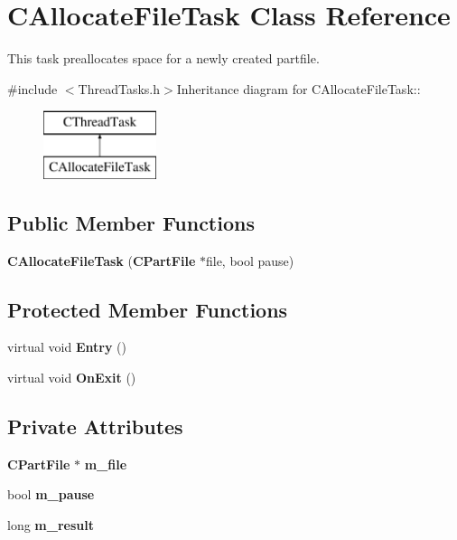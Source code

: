 \section{CAllocateFileTask Class Reference}
\label{classCAllocateFileTask}


This task preallocates space for a newly created partfile.  


{\ttfamily \#include $<$ThreadTasks.h$>$}Inheritance diagram for CAllocateFileTask::\begin{figure}[H]
\begin{center}
\leavevmode
\includegraphics[height=2cm]{classCAllocateFileTask}
\end{center}
\end{figure}
\subsection*{Public Member Functions}
\begin{DoxyCompactItemize}
\item 
{\bf CAllocateFileTask} ({\bf CPartFile} $\ast$file, bool pause)
\end{DoxyCompactItemize}
\subsection*{Protected Member Functions}
\begin{DoxyCompactItemize}
\item 
virtual void {\bf Entry} ()\label{classCAllocateFileTask_a03b090460a948ecdd522fa50ceaf6cf8}

\item 
virtual void {\bf OnExit} ()\label{classCAllocateFileTask_abf55789dd62e67cf82f93794e984348a}

\end{DoxyCompactItemize}
\subsection*{Private Attributes}
\begin{DoxyCompactItemize}
\item 
{\bf CPartFile} $\ast$ {\bf m\_\-file}\label{classCAllocateFileTask_a8bbefd9a2007c46d7c96daf82637b913}

\item 
bool {\bf m\_\-pause}\label{classCAllocateFileTask_a0828fd81e5e0a17171dc04d31fb89196}

\item 
long {\bf m\_\-result}\label{classCAllocateFileTask_abab84ba97c2f2c988caf7e6e8f6cd531}

\end{DoxyCompactItemize}


